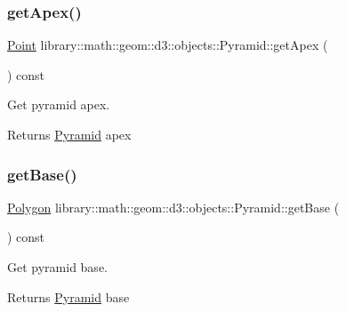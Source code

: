 \subsubsection{\texorpdfstring{get\+Apex()}{getApex()}}
{\footnotesize\ttfamily \hyperlink{classlibrary_1_1math_1_1geom_1_1d3_1_1objects_1_1_point}{Point} library\+::math\+::geom\+::d3\+::objects\+::\+Pyramid\+::get\+Apex (\begin{DoxyParamCaption}{ }\end{DoxyParamCaption}) const}



Get pyramid apex. 


\begin{DoxyCode}
\end{DoxyCode}


\begin{DoxyReturn}{Returns}
\hyperlink{classlibrary_1_1math_1_1geom_1_1d3_1_1objects_1_1_pyramid}{Pyramid} apex 
\end{DoxyReturn}
\mbox{\label{classlibrary_1_1math_1_1geom_1_1d3_1_1objects_1_1_pyramid_a247e3c188d7919b2043e59d46b67c2ef}} 
\subsubsection{\texorpdfstring{get\+Base()}{getBase()}}
{\footnotesize\ttfamily \hyperlink{classlibrary_1_1math_1_1geom_1_1d3_1_1objects_1_1_polygon}{Polygon} library\+::math\+::geom\+::d3\+::objects\+::\+Pyramid\+::get\+Base (\begin{DoxyParamCaption}{ }\end{DoxyParamCaption}) const}



Get pyramid base. 


\begin{DoxyCode}
\end{DoxyCode}


\begin{DoxyReturn}{Returns}
\hyperlink{classlibrary_1_1math_1_1geom_1_1d3_1_1objects_1_1_pyramid}{Pyramid} base 
\end{DoxyReturn}
\mbox{\label{classlibrary_1_1math_1_1geom_1_1d3_1_1objects_1_1_pyramid_a349eca33d7ce6a379bc7f0c9367e459f}} 
